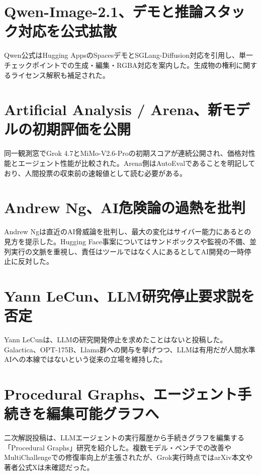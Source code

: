 \section{Qwen-Image-2.1、デモと推論スタック対応を公式拡散}
Qwen公式はHugging AppsのSpacesデモとSGLang-Diffusion対応を引用し、単一チェックポイントでの生成・編集・RGBA対応を案内した。生成物の権利に関するライセンス解釈も補足された。

\section{Artificial Analysis / Arena、新モデルの初期評価を公開}
同一観測窓でGrok 4.7とMiMo-V2.6-Proの初期スコアが連続公開され、価格対性能とエージェント性能が比較された。Arena側はAutoEvalであることを明記しており、人間投票の収束前の速報値として読む必要がある。

\section{Andrew Ng、AI危険論の過熱を批判}
Andrew Ngは直近のAI脅威論を批判し、最大の変化はサイバー能力にあるとの見方を提示した。Hugging Face事案についてはサンドボックスや監視の不備、並列実行の文脈を重視し、責任はツールではなく人にあるとしてAI開発の一時停止に反対した。

\section{Yann LeCun、LLM研究停止要求説を否定}
Yann LeCunは、LLMの研究開発停止を求めたことはないと投稿した。Galactica、OPT-175B、Llama群への関与を挙げつつ、LLMは有用だが人間水準AIへの本線ではないという従来の立場を維持した。

\section{Procedural Graphs、エージェント手続きを編集可能グラフへ}
二次解説投稿は、LLMエージェントの実行履歴から手続きグラフを編集する「Procedural Graphs」研究を紹介した。複数モデル・ベンチでの改善やMultiChallengeでの修復率向上が主張されたが、Grok実行時点ではarXiv本文や著者公式Xは未確認だった。

